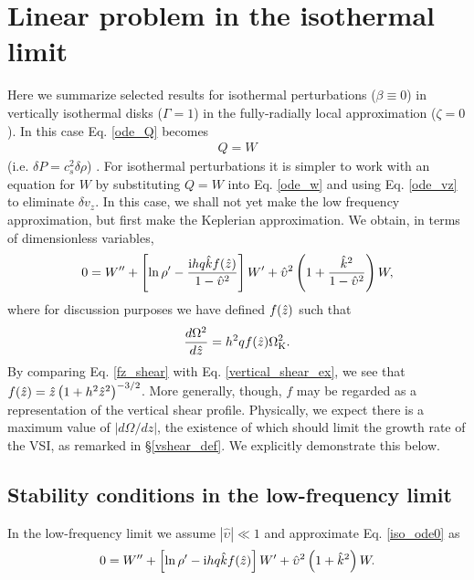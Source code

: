\section{Linear problem in the isothermal limit}\label{iso_discuss}  
Here we summarize selected results for isothermal
perturbations ($\beta\equiv 0$) in vertically isothermal disks 
($\Gamma=1$) in the fully-radially local approximation
($\zeta=0$). In this case Eq. \ref{ode_Q}
becomes    
\begin{align} 
  Q = W 
\end{align}
(i.e. $\delta P = c_s^2\delta \rho$)%
. For isothermal perturbations it is 
simpler to work with an equation for $W$ by substituting $Q=W$ into
Eq. \ref{ode_w} and using Eq. \ref{ode_vz} to eliminate $\delta v_z$. 
In this case, we shall not yet make the low frequency
approximation, but first make the  Keplerian approximation. We
obtain, in terms of dimensionless variables, 
\begin{align}
  0 = W^{\prime\prime} + \left[\ln\rho^\prime - \frac{\mathrm{i} h q \hat{k} f(\hat{z})
      }{1-\hat{\upsilon}^2} \right]W^\prime +
  \hat{\upsilon}^2\left(1+\frac{\hat{k}^2}{1-\hat{\upsilon}^2}\right)W,\label{iso_ode0} 
\end{align}
where for discussion purposes we have defined $f(\hat{z})$ such that
\begin{align}\label{fz_shear}
  \frac{d\Omega^2}{d\hat{z}} = h^2q f(\hat{z})\Omega_{\rm K}^2.
\end{align}
By comparing Eq. \ref{fz_shear} with Eq. \ref{vertical_shear_ex}, we
see that $f(\hat{z})= 
\hat{z}\left(1+h^2\hat{z}^2\right)^{-3/2}$. More generally, though,
$f$ may be regarded as a representation of the vertical
shear profile. Physically, we expect there is a maximum value of 
$|d\Omega/dz|$, the existence of which should limit the growth rate of
the VSI,  as remarked in \S\ref{vshear_def}. We explicitly demonstrate
this below.     

\subsection{Stability conditions in the low-frequency limit}
In the low-frequency limit we assume $|\hat{\upsilon}|\ll 1$ and
approximate Eq. \ref{iso_ode0} as 
\begin{align}
  0 = W^{\prime\prime} + \left[\ln\rho^\prime - \mathrm{i} h q \hat{k}
    f(\hat{z})\right]W^\prime +
  \hat{\upsilon}^2\left(1+\hat{k}^2\right)W. \label{iso_ode1}
\end{align}
